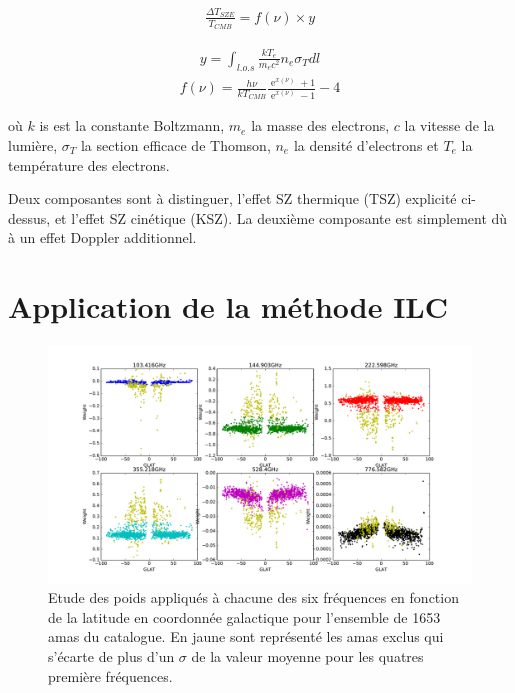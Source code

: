 \documentclass[a4paper,11pt]{article}
\DeclareMathOperator{\e}{e}
\begin{document}
\begin{align*}
  \frac{\Delta T_{SZE}}{T_{CMB}} = f(\nu) \times  y
\end{align*}

\begin{multicols}{2}\noindent
\begin{align*}
  y = \int_{l.o.s} \frac{kT_e}{m_e c^2} n_e \sigma_T dl 
\end{align*}
\begin{align*}
  f(\nu) = \frac{h \nu}{k T_{CMB}} \frac{\e^{x(\nu)}+1}{\e^{x(\nu)}-1} - 4
\end{align*}
\end{multicols}
où $k$ is est la constante Boltzmann, $m_e$ la masse des electrons, $c$
la vitesse de la lumière, $\sigma_T$ la section efficace de Thomson, 
$n_e$ la densité d'electrons et $T_e$ la température des electrons.

Deux composantes sont à distinguer, l'effet SZ thermique (TSZ)
explicité ci-dessus, et l'effet SZ cinétique (KSZ). La deuxième composante est simplement dù à un effet
Doppler additionnel. 

\section{Application de la méthode ILC}

\begin{figure}[b!]
  \centering
  \label{w_lat}
  \includegraphics[width=6in]{w_lat.pdf}
  \caption{Etude des poids appliqués à chacune des six fréquences en
    fonction de la latitude en coordonnée galactique pour
  l'ensemble de 1653 amas du catalogue. En jaune sont représenté les
  amas exclus qui s'écarte de plus d'un $\sigma$ de la valeur moyenne
  pour les quatres première fréquences.}
\end{figure}
\end{document}
